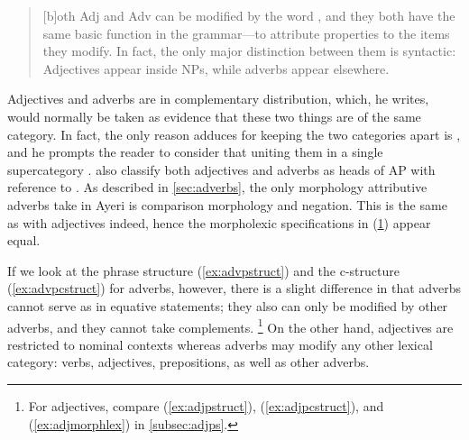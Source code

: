 \blockcquote[51]{carnie2013}{[b]oth Adj and Adv can be modified by the word
, and they both have the same basic function in the grammar---to
attribute properties to the items they modify. In fact, the only major
distinction between them is syntactic: Adjectives appear inside NPs, while
adverbs appear elsewhere.}

Adjectives and adverbs are in complementary distribution, which, he writes,
would normally be taken as evidence that these two things are of the same
category. In fact, the only reason \citet{carnie2013} adduces for keeping the
two categories apart is ,
and he prompts the reader to consider that uniting them in a single
supercategory . \citet[126]{bresnan2016} also
classify both adjectives and adverbs as heads of AP with reference to
\citet{emonds1976}. As described in \autoref{sec:adverbs}, the only morphology
attributive adverbs take in Ayeri is comparison morphology and negation. This
is the same as with adjectives indeed, hence the morpholexic specifications
in (\ref{ex:advmorphlex}) appear equal.

\begin{figure}[h]
\begin{morphlex}
\ex\label{ex:advmorphlex}%
\xe
\end{morphlex}
\end{figure}

If we look at the phrase structure (\ref{ex:advpstruct}) and the c-structure
(\ref{ex:advpcstruct}) for adverbs, however, there is a slight difference in
that adverbs cannot serve as \XCompl{} in equative statements; they also can
only be modified by other adverbs, and they cannot take complements.%
\footnote{For adjectives, compare (\ref{ex:adjpstruct}),
(\ref{ex:adjpcstruct}), and (\ref{ex:adjmorphlex}) in \autoref{subsec:adjps}.}
On the other hand, adjectives are restricted to nominal contexts whereas
adverbs may modify any other lexical category: verbs, adjectives, prepositions,
as well as other adverbs.

